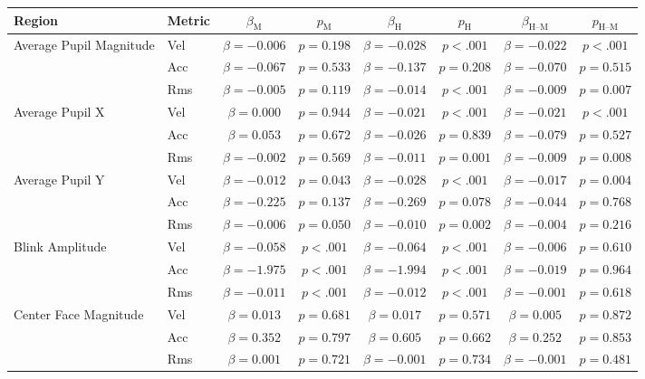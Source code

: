 \begin{tabular}{llcc|cc|cc}
\toprule
Region & Metric & $\beta_{\text{M}}$ & $p_{\text{M}}$ & $\beta_{\text{H}}$ & $p_{\text{H}}$ & $\beta_{\text{H--M}}$ & $p_{\text{H--M}}$ \\
\midrule
\multirow{3}{*}{Average Pupil Magnitude} & Vel & $\beta = -0.006$ & $p = 0.198$ & $\beta = -0.028$ & $p < .001$ & $\beta = -0.022$ & $p < .001$ \\
 & Acc & $\beta = -0.067$ & $p = 0.533$ & $\beta = -0.137$ & $p = 0.208$ & $\beta = -0.070$ & $p = 0.515$ \\
 & Rms & $\beta = -0.005$ & $p = 0.119$ & $\beta = -0.014$ & $p < .001$ & $\beta = -0.009$ & $p = 0.007$ \\
\midrule
\multirow{3}{*}{Average Pupil X} & Vel & $\beta = 0.000$ & $p = 0.944$ & $\beta = -0.021$ & $p < .001$ & $\beta = -0.021$ & $p < .001$ \\
 & Acc & $\beta = 0.053$ & $p = 0.672$ & $\beta = -0.026$ & $p = 0.839$ & $\beta = -0.079$ & $p = 0.527$ \\
 & Rms & $\beta = -0.002$ & $p = 0.569$ & $\beta = -0.011$ & $p = 0.001$ & $\beta = -0.009$ & $p = 0.008$ \\
\midrule
\multirow{3}{*}{Average Pupil Y} & Vel & $\beta = -0.012$ & $p = 0.043$ & $\beta = -0.028$ & $p < .001$ & $\beta = -0.017$ & $p = 0.004$ \\
 & Acc & $\beta = -0.225$ & $p = 0.137$ & $\beta = -0.269$ & $p = 0.078$ & $\beta = -0.044$ & $p = 0.768$ \\
 & Rms & $\beta = -0.006$ & $p = 0.050$ & $\beta = -0.010$ & $p = 0.002$ & $\beta = -0.004$ & $p = 0.216$ \\
\midrule
\multirow{3}{*}{Blink Amplitude} & Vel & $\beta = -0.058$ & $p < .001$ & $\beta = -0.064$ & $p < .001$ & $\beta = -0.006$ & $p = 0.610$ \\
 & Acc & $\beta = -1.975$ & $p < .001$ & $\beta = -1.994$ & $p < .001$ & $\beta = -0.019$ & $p = 0.964$ \\
 & Rms & $\beta = -0.011$ & $p < .001$ & $\beta = -0.012$ & $p < .001$ & $\beta = -0.001$ & $p = 0.618$ \\
\midrule
\multirow{3}{*}{Center Face Magnitude} & Vel & $\beta = 0.013$ & $p = 0.681$ & $\beta = 0.017$ & $p = 0.571$ & $\beta = 0.005$ & $p = 0.872$ \\
 & Acc & $\beta = 0.352$ & $p = 0.797$ & $\beta = 0.605$ & $p = 0.662$ & $\beta = 0.252$ & $p = 0.853$ \\
 & Rms & $\beta = 0.001$ & $p = 0.721$ & $\beta = -0.001$ & $p = 0.734$ & $\beta = -0.001$ & $p = 0.481$ \\

\end{tabular}
